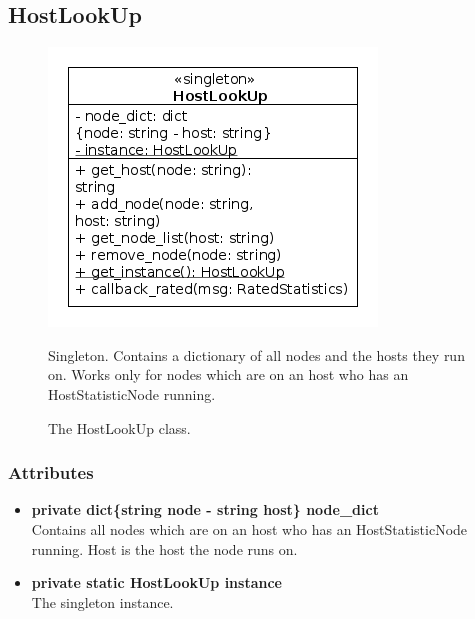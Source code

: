 \newpage
\subsection{HostLookUp}
\begin{figure}[htbp]
	\begin{minipage}[t]{8cm}
		\vspace{0pt}
		\centering
		\includegraphics[scale=0.6]{./diagram_pictures/reactor/HostLookUp.png}
		\caption{The HostLookUp class.}
	\end{minipage}
	\hfill
	\begin{minipage}[t]{8cm}
		\vspace{10pt}
			Singleton. Contains a dictionary of all nodes and the hosts they run on. Works only for nodes which are on an host who has an HostStatisticNode running.
	\end{minipage}
\end{figure}  


\subsubsection{Attributes}
\begin{itemize}
	\item \textbf{ private dict\{string node - string host\} node\_dict }\\
		Contains all nodes which are on an host who has an HostStatisticNode running. Host is the host the node runs on.
	\item \textbf{ private static HostLookUp instance }\\
		The singleton instance.
\end{itemize}
